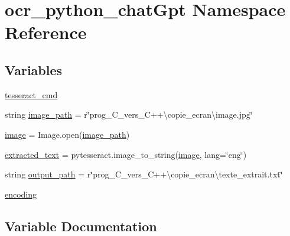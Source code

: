 \hypertarget{namespaceocr__python__chatGpt}{}\section{ocr\+\_\+python\+\_\+chat\+Gpt Namespace Reference}
\label{namespaceocr__python__chatGpt}
\subsection*{Variables}
\begin{DoxyCompactItemize}
\item 
\hyperlink{namespaceocr__python__chatGpt_a68e633786bdc58e2ae1d812b5b1bc8e6}{tesseract\+\_\+cmd}
\item 
string \hyperlink{namespaceocr__python__chatGpt_a2ef1bf5cc17e2b07ddc32e4114558e34}{image\+\_\+path} = r\char`\"{}prog\+\_\+\+C\+\_\+vers\+\_\+C++\textbackslash{}copie\+\_\+ecran\textbackslash{}image.\+jpg\char`\"{}
\item 
\hyperlink{namespaceocr__python__chatGpt_a40d1b231c42af2861c8f7fee13e6dd94}{image} = Image.\+open(\hyperlink{namespaceocr__python__chatGpt_a2ef1bf5cc17e2b07ddc32e4114558e34}{image\+\_\+path})
\item 
\hyperlink{namespaceocr__python__chatGpt_a3beb33c16468dcb7748960adfa14aee1}{extracted\+\_\+text} = pytesseract.\+image\+\_\+to\+\_\+string(\hyperlink{namespaceocr__python__chatGpt_a40d1b231c42af2861c8f7fee13e6dd94}{image}, lang=\char`\"{}eng\char`\"{})
\item 
string \hyperlink{namespaceocr__python__chatGpt_a849924c73cc1fdf132ce5765beea5bca}{output\+\_\+path} = r\char`\"{}prog\+\_\+\+C\+\_\+vers\+\_\+C++\textbackslash{}copie\+\_\+ecran\textbackslash{}texte\+\_\+extrait.\+txt\char`\"{}
\item 
\hyperlink{namespaceocr__python__chatGpt_a58751e0be4b4db96998096a09dc25ffb}{encoding}
\end{DoxyCompactItemize}


\subsection{Variable Documentation}
\mbox{\label{namespaceocr__python__chatGpt_a58751e0be4b4db96998096a09dc25ffb}} 
